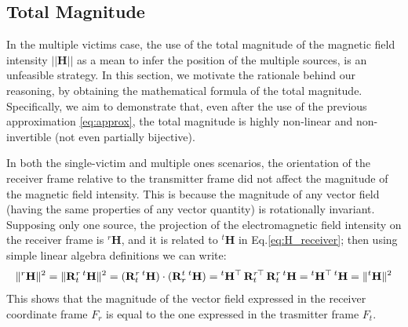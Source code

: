 \subsection{Total Magnitude}
In the multiple victims case, the use of the total magnitude of the magnetic
field intensity $|| \mathbf{H} ||$ as a mean to infer the position of
the multiple sources, is an unfeasible strategy.
In this section, we motivate the rationale behind our reasoning, by obtaining
the mathematical formula of the total magnitude.
Specifically, we aim to demonstrate that, even after the use of the previous 
approximation \ref{eq:approx}, the total magnitude is highly non-linear and 
non-invertible (not even partially bijective).

\noindent
In both the single-victim and multiple ones scenarios, the orientation of the receiver frame 
relative to the transmitter frame did not affect the magnitude of the magnetic 
field intensity.
This is because the magnitude of any vector field (having the same 
properties of any vector quantity) is rotationally invariant.
Supposing only one source, the projection of the electromagnetic field intensity on the receiver frame is ${}^r\mathbf{H}$,
and it is related to ${}^t \mathbf{H}$ in Eq.\ref{eq:H_receiver}; then 
using simple linear algebra definitions we can write:
\begin{equation}
\|{}^r\mathbf{H}\|^2 = \|\mathbf{R}^r_t \, {}^t\mathbf{H}\|^2 = 
(\mathbf{R}^r_t \, {}^t\mathbf{H}) \cdot (\mathbf{R}^t_r \, {}^t\mathbf{H}) = 
{}^t\mathbf{H}^\top \, {\mathbf{R}^r_t}\mkern-2mu^\top \, \mathbf{R}^r_t \, {}^t\mathbf{H} = 
{}^t\mathbf{H}^\top \, {}^t\mathbf{H} = \|{}^t\mathbf{H}\|^2
\label{eq:magnitude_invariant}
\end{equation}
This shows that the magnitude of the vector field expressed in the receiver 
coordinate frame $F_r$ is equal to the one expressed in the trasmitter frame $F_t$.

